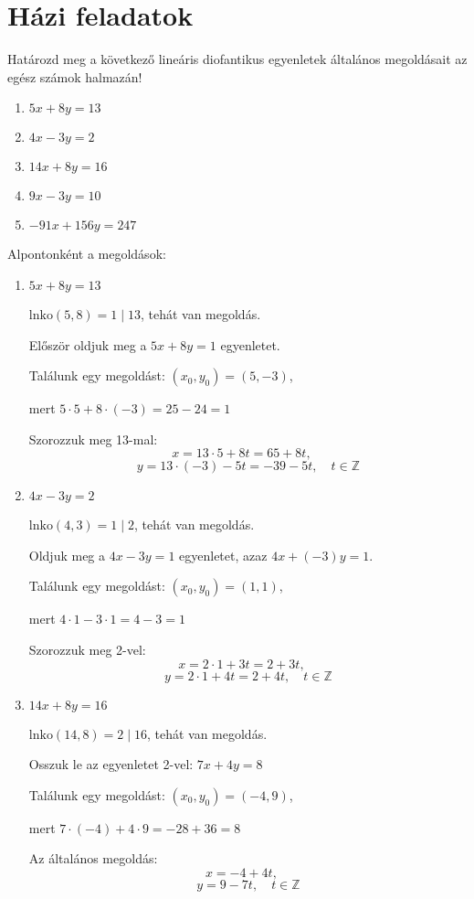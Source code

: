 \section*{Házi feladatok}
\begin{problem}
Határozd meg a következő lineáris diofantikus egyenletek általános
megoldásait az egész számok halmazán! 
\begin{enumerate}
\item $5x+8y=13$ 
\item $4x-3y=2$ 
\item $14x+8y=16$ 
\item $9x-3y=10$ 
\item $-91x+156y=247$ 
\end{enumerate}
\end{problem}

\begin{solution}
Alpontonként a megoldások:
\begin{enumerate}
\item $5x+8y=13$

$\mathrm{lnko}(5,8)=1\mid13$, tehát van megoldás.

Először oldjuk meg a $5x+8y=1$ egyenletet.

Találunk egy megoldást: $(x_{0},y_{0})=(5,-3)$,

mert $5\cdot5+8\cdot(-3)=25-24=1$

Szorozzuk meg 13-mal: 
\[
x=13\cdot5+8t=65+8t,\quad
\]
\[
y=13\cdot(-3)-5t=-39-5t,\quad t\in\mathbb{Z}
\]

\item $4x-3y=2$

$\mathrm{lnko}(4,3)=1\mid2$, tehát van megoldás.

Oldjuk meg a $4x-3y=1$ egyenletet, azaz $4x+(-3)y=1$.

Találunk egy megoldást: $(x_{0},y_{0})=(1,1)$,

mert $4\cdot1-3\cdot1=4-3=1$

Szorozzuk meg 2-vel: 
\[
x=2\cdot1+3t=2+3t,\quad
\]
\[
y=2\cdot1+4t=2+4t,\quad t\in\mathbb{Z}
\]

\item $14x+8y=16$

$\mathrm{lnko}(14,8)=2\mid16$, tehát van megoldás.

Osszuk le az egyenletet 2-vel: $7x+4y=8$

Találunk egy megoldást: $(x_{0},y_{0})=(-4,9)$,

mert $7\cdot(-4)+4\cdot9=-28+36=8$

Az általános megoldás: 
\[
x=-4+4t,\quad
\]
\[
y=9-7t,\quad t\in\mathbb{Z}
\]


\end{enumerate}
\end{solution}
